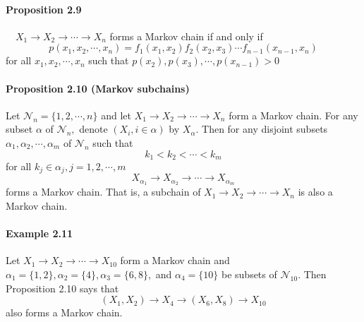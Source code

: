 \documentclass[8pt]{article}
\begin{document}
\paragraph{Proposition 2.9} $\quad X_{1} \rightarrow X_{2} \rightarrow \cdots \rightarrow X_{n}$ forms a Markov chain if and only if
$$
p\left(x_{1}, x_{2}, \cdots, x_{n}\right)=f_{1}\left(x_{1}, x_{2}\right) f_{2}\left(x_{2}, x_{3}\right) \cdots f_{n-1}\left(x_{n-1}, x_{n}\right)
$$
for all $x_{1}, x_{2}, \cdots, x_{n}$ such that $p\left(x_{2}\right), p\left(x_{3}\right), \cdots, p\left(x_{n-1}\right)>0$

\paragraph{Proposition 2.10 (Markov subchains)} Let $\mathcal{N}_{n}=\{1,2, \cdots, n\}$ and let $X_{1} \rightarrow X_{2} \rightarrow \cdots \rightarrow X_{n}$ form a Markov chain. For any subset $\alpha$ of $\mathcal{N}_{n},$ denote $\left(X_{i}, i \in \alpha\right)$ by $X_{\alpha} .$ Then for any disjoint subsets $\alpha_{1}, \alpha_{2}, \cdots, \alpha_{m}$ of $\mathcal{N}_{n}$ such that
$$
k_{1}<k_{2}<\cdots<k_{m}
$$
for all $k_{j} \in \alpha_{j}, j=1,2, \cdots, m$
$$
X_{\alpha_{1}} \rightarrow X_{\alpha_{2}} \rightarrow \cdots \rightarrow X_{\alpha_{m}}
$$
forms a Markov chain. That is, a subchain of $X_{1} \rightarrow X_{2} \rightarrow \cdots \rightarrow X_{n}$ is also a Markov chain.

\paragraph{Example 2.11} Let $X_{1} \rightarrow X_{2} \rightarrow \cdots \rightarrow X_{10}$ form a Markov chain and $\alpha_{1}=\{1,2\}, \alpha_{2}=\{4\}, \alpha_{3}=\{6,8\},$ and $\alpha_{4}=\{10\}$ be subsets of $\mathcal{N}_{10} .$ Then
Proposition 2.10 says that
$$
\left(X_{1}, X_{2}\right) \rightarrow X_{4} \rightarrow\left(X_{6}, X_{8}\right) \rightarrow X_{10}
$$
also forms a Markov chain.
\end{document}
